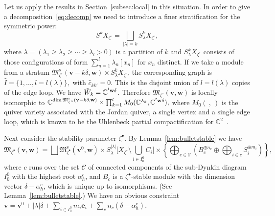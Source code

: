 \documentclass[10pt,a4paper]{amsart}
\theoremstyle{definition}
\numberwithin{equation}{section}
\newcommand{\lemref}[1]{Lemma~\ref{#1}}
\newcommand{\subsecref}[1]{Section~\ref{#1}}
\newcommand{\lsp}[2]{{\mskip-.3mu}{}^{#1}\mskip-1mu{#2}}
\newcommand{\C}{{\mathbb C}}
\newcommand{\M}{{\mathfrak M}} %
\newcommand{\Mreg}{\M^{\operatorname{s}}}
\newcommand{\bv}{{\mathbf v}} %
\newcommand{\bw}{{\mathbf w}} %
\newcommand{\be}{{\mathbf e}}
\begin{document}
Let us apply the results in \subsecref{subsec:local} in this
situation. In order to give a decomposition~\eqref{eq:decomp} we need
to introduce a f\/iner stratif\/ication for the symmetric power:
\begin{equation*}
   S^k X_{\zeta^\circ} = \bigsqcup_{|\lambda| = k} S^k_\lambda X_{\zeta^\circ},
\end{equation*}
where $\lambda = (\lambda_1 \ge \lambda_2\ge \cdots\ge \lambda_l > 0)$
is a partition of $k$ and $S^k_\lambda X_{\zeta^\circ}$ consists of
those conf\/igurations of form $\sum_{n=1}^l \lambda_n [x_n]$ for
$x_n$ distinct. If we take a module from a stratum
$\Mreg_{\zeta^\circ}(\bv-k\delta,\bw) \times S^k_\lambda
X_{\zeta^\circ}$, the corresponding graph is
\(
   \widehat I = \{ 1,\dots, l = l(\lambda)\},
\)
with
\(
   \widehat c_{kk'} = 0.
\)
This is the disjoint union of $l = l(\lambda)$ copies of the edge loop.
%
We have $\Hat{W}_k = \C^{\lsp{t}{\bw} \delta}$. Therefore
$\M_{\zeta^\circ}(\bv,\bw)$ is locally isomorphic to
\(
   \C^{\dim \Mreg_{\zeta^\circ}(\bv-k\delta,\bw)}\times
   \prod_{k=1}^l M_0(\C^{\lambda_k}, \C^{\lsp{t}{\bw} \delta}),
\)
where $M_0(\ ,\ )$ is the quiver variety associated with the Jordan
quiver, a single vertex and a single edge loop, which is known to be
the Uhlenbeck partial compactif\/ication for $\C^2$~\cite{Lecture}.

Next consider the stability parameter $\zeta^\bullet$. By \lemref{lem:bulletstable} we have
\begin{equation}\label{eq:Uhbullet}
  \M_{\zeta^\bullet}(\bv,\bw)
= \bigsqcup \Mreg_{\zeta^\bullet}(\bv^0,\bw)
  \times S^{|\lambda|}_\lambda
  \Big[X_{\zeta^\circ}\setminus \bigcup_{i\in I_0^0} C_i \Big]
  \times \left\{
    \bigoplus_{c\in\mathcal C} \left(
      B_c^{\oplus n_c} \oplus
    \bigoplus_{i\in c}  S_i^{\oplus m_i} \right)
    \right\},
\end{equation}
where $c$ runs over the set $\mathcal C$ of connected components of
the sub-Dynkin diagram $I_0^0$ with the highest root $\alpha^c_h$, and
$B_c$ is a $\zeta^\bullet$-stable module with the dimension vector
$\delta - \alpha^c_h$, which is unique up to isomorphisms.
(See \lemref{lem:bulletstable}.)
We have an obvious constraint
\(
   \bv = \bv^0 + |\lambda| \delta + \sum_{i\in I_0^0} m_i \be_i
   + \sum_c n_c (\delta - \alpha^c_h).
\)
\end{document}
